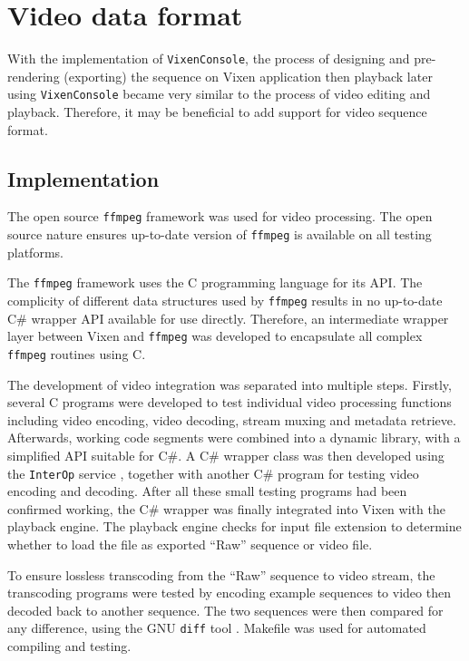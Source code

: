 \chapter{Video data format}
\renewcommand{\baselinestretch}{\mystretch}
\label{chap:Video}

With the implementation of \texttt{VixenConsole}, the process of designing and pre-rendering (exporting) the sequence on Vixen application then playback later using \texttt{VixenConsole} became very similar to the process of video editing and playback. Therefore, it may be beneficial to add support for video sequence format.

\section{Implementation}

The open source \texttt{ffmpeg} framework \cite{ffmpeg} was used for video processing. The open source nature ensures up-to-date version of \texttt{ffmpeg} is available on all testing platforms.

The \texttt{ffmpeg} framework uses the C programming language for its API. The complicity of different data structures used by \texttt{ffmpeg} results in no up-to-date C\# wrapper API available for use directly. Therefore, an intermediate wrapper layer between Vixen and \texttt{ffmpeg} was developed to encapsulate all complex \texttt{ffmpeg} routines using C.

The development of video integration was separated into multiple steps. Firstly, several C programs were developed to test individual video processing functions including video encoding, video decoding, stream muxing and metadata retrieve. Afterwards, working code segments were combined into a dynamic library, with a simplified API suitable for C\#. A C\# wrapper class was then developed using the \texttt{InterOp} service \cite{interop}, together with another C\# program for testing video encoding and decoding. After all these small testing programs had been confirmed working, the C\# wrapper was finally integrated into Vixen with the playback engine. The playback engine checks for input file extension to determine whether to load the file as exported ``Raw'' sequence or video file.

To ensure lossless transcoding from the ``Raw'' sequence to video stream, the transcoding programs were tested by encoding example sequences to video then decoded back to another sequence. The two sequences were then compared for any difference, using the GNU \texttt{diff} tool \cite{diff}. Makefile was used for automated compiling and testing.

